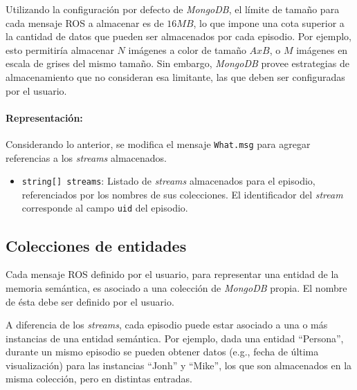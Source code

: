 Utilizando la configuración por defecto de \textit{MongoDB}, el límite de tamaño para cada mensaje ROS a almacenar es de $16 MB$, lo que impone una cota superior a la cantidad de datos que pueden ser almacenados por cada episodio. Por ejemplo, esto permitiría almacenar $N$ imágenes a color de tamaño $AxB$, o $M$ imágenes en escala de grises del mismo tamaño. Sin embargo, \textit{MongoDB} provee estrategias de almacenamiento que no consideran esa limitante, las que deben ser configuradas por el usuario.




\paragraph{Representación:}
Considerando lo anterior, se modifica el mensaje \texttt{What.msg} para agregar referencias a los \textit{streams} almacenados.
\begin{itemize}
	\item \texttt{string[] streams}: Listado de \textit{streams} almacenados para el episodio,  referenciados por los nombres de sus colecciones. El identificador del \textit{stream} corresponde al campo \texttt{uid} del episodio.
\end{itemize}


\subsection{Colecciones de entidades}

Cada mensaje ROS definido por el usuario, para representar una entidad de la memoria semántica, es  asociado a una colección de \textit{MongoDB} propia. El nombre de ésta debe ser definido por el usuario. 

A diferencia de los \textit{streams}, cada episodio puede estar asociado a una o más instancias de una entidad semántica. Por ejemplo, dada una entidad ``Persona'', durante un mismo episodio se pueden obtener datos (e.g., fecha de última visualización) para las instancias ``Jonh'' y ``Mike'', los que son almacenados en la misma colección, pero en distintas entradas.

